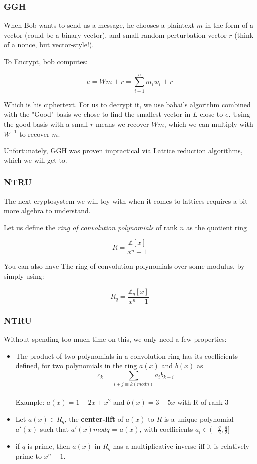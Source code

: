 \documentclass{beamer}
\newcommand{\zee}{\mathbb{Z}}
\begin{document}
\begin{frame}
\frametitle{GGH}

When Bob wants to send us a message, he chooses a plaintext $m$ in the form of a vector (could be a binary vector), and small random perturbation vector $r$ (think of a nonce, but vector-style!).

To Encrypt, bob computes:

\[ e = Wm + r = \sum_{i-1}^n m_iw_i + r \]

Which is his ciphertext. For us to decrypt it, we use babai's algorithm combined with the "Good" basis we chose to find the smallest vector in $L$ close to $e$. Using the good basis with a small $r$ means we recover $Wm$, which we can multiply with $W^{-1}$ to recover $m$.

Unfortunately, GGH was proven impractical via Lattice reduction algorithms, which we will get to.


\end{frame}

\begin{frame}
\frametitle{NTRU}

The next cryptosystem we will toy with when it comes to lattices requires a bit more algebra to understand.

Let us define the \textit{ring of convolution polynomials} of rank $n$ as the quotient ring 

\[ R = \frac{\zee[x]}{x^n-1} \]

You can also have The ring of convolution polynomials over some modulus, by simply using:

\[ R_q = \frac{\zee_q[x]}{x^n-1} \] 


\end{frame}

\begin{frame}
\frametitle{NTRU}

Without spending too much time on this, we only need a few properties:
\begin{itemize}
\item The product of two polynomials in a convolution ring has its coefficients defined, for two polynomials in the ring $a(x)$ and $b(x)$ as \\
\[ c_k = \sum_{i+j \equiv k (mod n)} a_i b_{k-i}\] \\
Example: $a(x) = 1 - 2x + x^2$ and $b(x) = 3 - 5x$ with R of rank 3
\item Let $a(x) \in R_q$, the \textbf{center-lift} of $a(x)$ to $R$ is a unique polynomial $a'(x)$ such that $a'(x) mod q$ = $a(x)$, with coefficients $a_i \in (-\frac{q}{2}, \frac{q}{2}]$	
\item if $q$ is prime, then $a(x)$ in $R_q$ has a multiplicative inverse iff it is relatively prime to $x^n-1$.
\end{itemize}
\end{frame}
\end{document}

